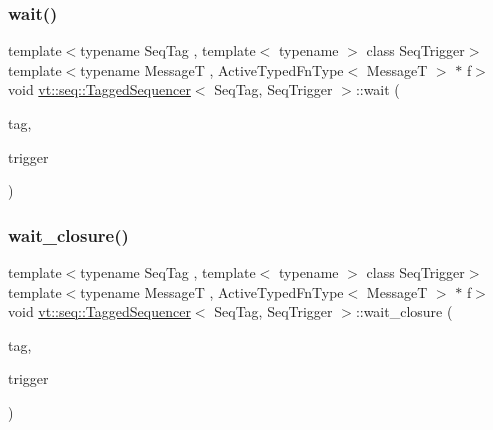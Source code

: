 \subsubsection{\texorpdfstring{wait()}{wait()}\hspace{0.1cm}{\footnotesize\ttfamily [2/2]}}
{\footnotesize\ttfamily template$<$typename Seq\+Tag , template$<$ typename $>$ class Seq\+Trigger$>$ \\
template$<$typename MessageT , Active\+Typed\+Fn\+Type$<$ Message\+T $>$ $\ast$ f$>$ \\
void \hyperlink{structvt_1_1seq_1_1_tagged_sequencer}{vt\+::seq\+::\+Tagged\+Sequencer}$<$ Seq\+Tag, Seq\+Trigger $>$\+::wait (\begin{DoxyParamCaption}\item[{\hyperlink{namespacevt_a84ab281dae04a52a4b243d6bf62d0e52}{Tag\+Type} const \&}]{tag,  }\item[{\hyperlink{structvt_1_1seq_1_1_tagged_sequencer_a4b015f2f7d3197a66af5576f0e63a834}{Seq\+Trigger\+Type}$<$ MessageT $>$}]{trigger }\end{DoxyParamCaption})}

\mbox{\label{structvt_1_1seq_1_1_tagged_sequencer_a54b83e9239a17a4fd75f8c2c9ac59cee}} 
\subsubsection{\texorpdfstring{wait\+\_\+closure()}{wait\_closure()}\hspace{0.1cm}{\footnotesize\ttfamily [1/2]}}
{\footnotesize\ttfamily template$<$typename Seq\+Tag , template$<$ typename $>$ class Seq\+Trigger$>$ \\
template$<$typename MessageT , Active\+Typed\+Fn\+Type$<$ Message\+T $>$ $\ast$ f$>$ \\
void \hyperlink{structvt_1_1seq_1_1_tagged_sequencer}{vt\+::seq\+::\+Tagged\+Sequencer}$<$ Seq\+Tag, Seq\+Trigger $>$\+::wait\+\_\+closure (\begin{DoxyParamCaption}\item[{\hyperlink{namespacevt_a84ab281dae04a52a4b243d6bf62d0e52}{Tag\+Type} const \&}]{tag,  }\item[{\hyperlink{namespacevt_1_1seq_aa88b0d93284d188be39704024ab58b8f}{Seq\+Non\+Migratable\+Trigger\+Type}$<$ MessageT $>$}]{trigger }\end{DoxyParamCaption})}

